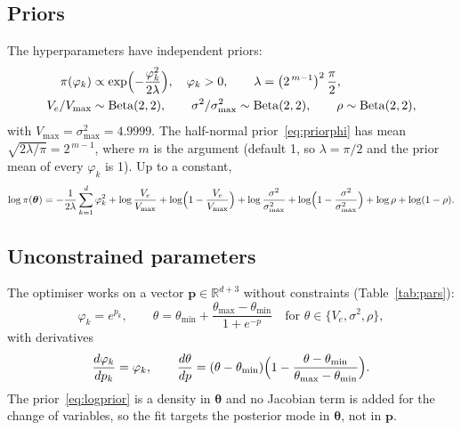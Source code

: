 \documentclass[11pt,a4paper]{article}
\newcommand{\code}[1]{\texttt{\detokenize{#1}}}
\newcommand{\R}{\mathbb{R}}
\newcommand{\ve}{V_e}
\numberwithin{equation}{section}
\begin{document}
\subsection{Priors}
The hyperparameters have independent priors:
\begin{align}
\pi(\varphi_k)&\propto\exp\Bigl(-\frac{\varphi_k^2}{2\lambda}\Bigr),\quad \varphi_k>0,
\qquad \lambda=\bigl(2^{\,m-1}\bigr)^2\,\frac{\pi}{2}, \label{eq:priorphi}\\
\ve/V_{\max}&\sim\mathrm{Beta}(2,2),\qquad \sigma^2/\sigma^2_{\max}\sim\mathrm{Beta}(2,2),\qquad
\rho\sim\mathrm{Beta}(2,2),
\end{align}
with $V_{\max}=\sigma^2_{\max}=4.9999$. The half-normal prior~\eqref{eq:priorphi} has mean
$\sqrt{2\lambda/\pi}=2^{\,m-1}$, where $m$ is the argument \code{modeprior} (default 1, so
$\lambda=\pi/2$ and the prior mean of every $\varphi_k$ is 1). Up to a constant,
\begin{equation}
\log\pi(\bm\theta)=-\frac{1}{2\lambda}\sum_{k=1}^{d}\varphi_k^2
+\log\frac{\ve}{V_{\max}}+\log\Bigl(1-\frac{\ve}{V_{\max}}\Bigr)
+\log\frac{\sigma^2}{\sigma^2_{\max}}+\log\Bigl(1-\frac{\sigma^2}{\sigma^2_{\max}}\Bigr)
+\log\rho+\log(1-\rho).
\label{eq:logprior}
\end{equation}

\subsection{Unconstrained parameters}
The optimiser works on a vector $\bm{p}\in\R^{d+3}$ without constraints (Table~\ref{tab:pars}):
\begin{equation}
\varphi_k=e^{p_k},\qquad
\theta=\theta_{\min}+\frac{\theta_{\max}-\theta_{\min}}{1+e^{-p}}\quad\text{for }\theta\in\{\ve,\sigma^2,\rho\},
\label{eq:transform}
\end{equation}
with derivatives
\begin{equation}
\frac{d\varphi_k}{dp_k}=\varphi_k,\qquad
\frac{d\theta}{dp}=(\theta-\theta_{\min})\Bigl(1-\frac{\theta-\theta_{\min}}{\theta_{\max}-\theta_{\min}}\Bigr).
\label{eq:dtransform}
\end{equation}
The prior~\eqref{eq:logprior} is a density in $\bm\theta$ and no Jacobian term is added for the
change of variables, so the fit targets the posterior mode in $\bm\theta$, not in $\bm{p}$.
\end{document}
